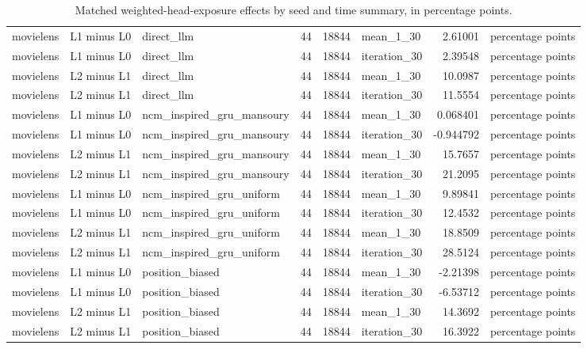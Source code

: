 \begin{table}[htbp!]
\begin{tabular}{lllrrlrl}
movielens & L1 minus L0 & direct\_llm & 44 & 18844 & mean\_1\_30 & 2.61001 & percentage points \\
movielens & L1 minus L0 & direct\_llm & 44 & 18844 & iteration\_30 & 2.39548 & percentage points \\
movielens & L2 minus L1 & direct\_llm & 44 & 18844 & mean\_1\_30 & 10.0987 & percentage points \\
movielens & L2 minus L1 & direct\_llm & 44 & 18844 & iteration\_30 & 11.5554 & percentage points \\
movielens & L1 minus L0 & ncm\_inspired\_gru\_mansoury & 44 & 18844 & mean\_1\_30 & 0.068401 & percentage points \\
movielens & L1 minus L0 & ncm\_inspired\_gru\_mansoury & 44 & 18844 & iteration\_30 & -0.944792 & percentage points \\
movielens & L2 minus L1 & ncm\_inspired\_gru\_mansoury & 44 & 18844 & mean\_1\_30 & 15.7657 & percentage points \\
movielens & L2 minus L1 & ncm\_inspired\_gru\_mansoury & 44 & 18844 & iteration\_30 & 21.2095 & percentage points \\
movielens & L1 minus L0 & ncm\_inspired\_gru\_uniform & 44 & 18844 & mean\_1\_30 & 9.89841 & percentage points \\
movielens & L1 minus L0 & ncm\_inspired\_gru\_uniform & 44 & 18844 & iteration\_30 & 12.4532 & percentage points \\
movielens & L2 minus L1 & ncm\_inspired\_gru\_uniform & 44 & 18844 & mean\_1\_30 & 18.8509 & percentage points \\
movielens & L2 minus L1 & ncm\_inspired\_gru\_uniform & 44 & 18844 & iteration\_30 & 28.5124 & percentage points \\
movielens & L1 minus L0 & position\_biased & 44 & 18844 & mean\_1\_30 & -2.21398 & percentage points \\
movielens & L1 minus L0 & position\_biased & 44 & 18844 & iteration\_30 & -6.53712 & percentage points \\
movielens & L2 minus L1 & position\_biased & 44 & 18844 & mean\_1\_30 & 14.3692 & percentage points \\
movielens & L2 minus L1 & position\_biased & 44 & 18844 & iteration\_30 & 16.3922 & percentage points \\
\hline
\end{tabular}
\caption{Matched weighted-head-exposure effects by seed and time summary, in percentage points.}
\label{chap:results:tab:rq1_feedback_weighted_head_exposure}
\end{table}
